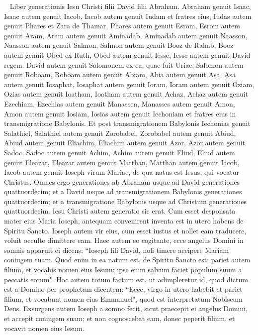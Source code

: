 
\begin{biblechapter}   
\verse Liber generationis Iesu Christi filii David filii Abraham. 
\verse Abraham genuit Isaac, Isaac autem genuit Iacob, Iacob autem genuit Iudam et fratres eius, 
\verse Iudas autem genuit Phares et Zara de Thamar, Phares autem genuit Esrom, Esrom autem genuit Aram, 
\verse Aram autem genuit Aminadab, Aminadab autem genuit Naasson, Naasson autem genuit Salmon, 
\verse Salmon autem genuit Booz de Rahab, Booz autem genuit Obed ex Ruth, Obed autem genuit Iesse,  
\verse Iesse autem genuit David regem. David autem genuit Salomonem ex ea, quae fuit Uriae, 
\verse Salomon autem genuit Roboam, Roboam autem genuit Abiam, Abia autem genuit Asa, 
\verse Asa autem genuit Iosaphat, Iosaphat autem genuit Ioram, Ioram autem genuit Oziam, 
\verse Ozias autem genuit Ioatham, Ioatham autem genuit Achaz, Achaz autem genuit Ezechiam,  
\verse Ezechias autem genuit Manassen, Manasses autem genuit Amon, Amon autem genuit Iosiam, 
\verse Iosias autem genuit Iechoniam et fratres eius in transmigratione Babylonis. 
\verse Et post transmigrationem Babylonis Iechonias genuit Salathiel, Salathiel autem genuit Zorobabel, 
\verse Zorobabel autem genuit Abiud, Abiud autem genuit Eliachim, Eliachim autem genuit Azor, 
\verse Azor autem genuit Sadoc, Sadoc autem genuit Achim, Achim autem genuit Eliud, 
\verse Eliud autem genuit Eleazar, Eleazar autem genuit Matthan, Matthan autem genuit Iacob, 
\verse Iacob autem genuit Ioseph virum Mariae, de qua natus est Iesus, qui vocatur Christus. 
\verse Omnes ergo generationes ab Abraham usque ad David generationes quattuordecim; et a David usque ad transmigrationem Babylonis generationes quattuordecim; et a transmigratione Babylonis usque ad Christum generationes quattuordecim. 
\verse Iesu Christi autem generatio sic erat. Cum esset desponsata mater eius Maria Ioseph, antequam convenirent inventa est in utero habens de Spiritu Sancto. 
\verse Ioseph autem vir eius, cum esset iustus et nollet eam traducere, voluit occulte dimittere eam. 
\verse Haec autem eo cogitante, ecce angelus Domini in somnis apparuit ei dicens: “Ioseph fili David, noli timere accipere Mariam coniugem tuam. Quod enim in ea natum est, de Spiritu Sancto est; 
\verse pariet autem filium, et vocabis nomen eius Iesum: ipse enim salvum faciet populum suum a peccatis eorum". 
\verse Hoc autem totum factum est, ut adimpleretur id, quod dictum est a Domino per prophetam dicentem: 
\verse “Ecce, virgo in utero habebit et pariet filium, et vocabunt nomen eius Emmanuel", quod est interpretatum Nobiscum Deus. 
\verse Exsurgens autem Ioseph a somno fecit, sicut praecepit ei angelus Domini, et accepit coniugem suam; 
\verse et non cognoscebat eam, donec peperit filium, et vocavit nomen eius Iesum. 
\end{biblechapter}


